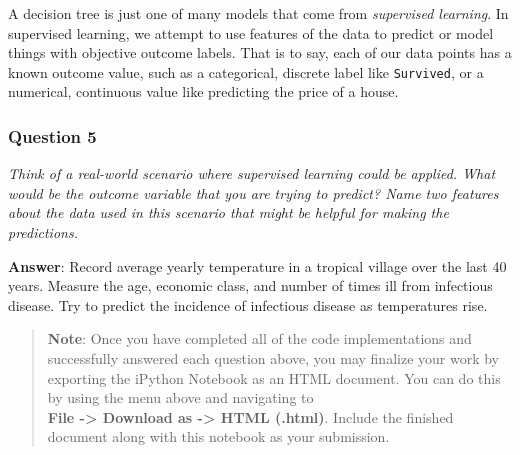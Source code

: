 \documentclass[11pt]{article}
\begin{document}
A decision tree is just one of many models that come from
\emph{supervised learning}. In supervised learning, we attempt to use
features of the data to predict or model things with objective outcome
labels. That is to say, each of our data points has a known outcome
value, such as a categorical, discrete label like
\texttt{\textquotesingle{}Survived\textquotesingle{}}, or a numerical,
continuous value like predicting the price of a house.

\hypertarget{question-5}{%
\subsubsection{Question 5}\label{question-5}}

\emph{Think of a real-world scenario where supervised learning could be
applied. What would be the outcome variable that you are trying to
predict? Name two features about the data used in this scenario that
might be helpful for making the predictions.}

    \textbf{Answer}: Record average yearly temperature in a tropical village
over the last 40 years. Measure the age, economic class, and number of
times ill from infectious disease. Try to predict the incidence of
infectious disease as temperatures rise.

    \begin{quote}
\textbf{Note}: Once you have completed all of the code implementations
and successfully answered each question above, you may finalize your
work by exporting the iPython Notebook as an HTML document. You can do
this by using the menu above and navigating to\\
\textbf{File -\textgreater{} Download as -\textgreater{} HTML (.html)}.
Include the finished document along with this notebook as your
submission.
\end{quote}


    
    
    
    
\end{document}
